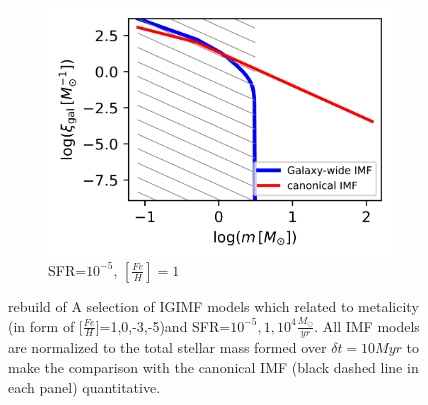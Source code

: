 \begin{figure}
\begin{subfigure}[b]{0.45\textwidth}
	\includegraphics[width=\textwidth]{sfr1e-5-feh1.png}
	\caption{SFR=$10^{-5}$, $[\frac{Fe}{H}]=1$}
	\label{fig:s1e4-1}
\end{subfigure}
	\caption{rebuild of A selection of IGIMF models which related to metalicity (in form of $[\frac{Fe}{H}$]=1,0,-3,-5)and SFR=$10^{-5},1,10^{4} \frac{M_{\odot}}{yr}$. All IMF models are
	normalized to the total stellar mass formed over $\delta t = 10 Myr$ to make the comparison with the canonical IMF (black dashed line in each panel)
	quantitative.}
\label{fig:grid-sfr}
\end{figure}

